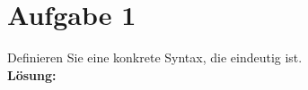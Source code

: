 \documentclass[11pt,a4paper,ngerman]{article}
\begin{document}

\section*{Aufgabe 1}

Definieren Sie eine konkrete Syntax, die eindeutig ist. \\

\textbf{Lösung:}\\




\label{LastPage}
\end{document}

